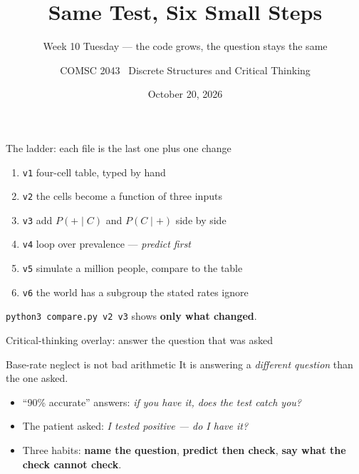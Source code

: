 \documentclass[aspectratio=169,10pt]{beamer}
\title{Same Test, Six Small Steps}
\subtitle{Week 10 Tuesday --- the code grows, the question stays the same}
\author{COMSC 2043 \textbullet\ Discrete Structures and Critical Thinking}
\date{October 20, 2026}
\begin{document}

\begin{frame}{The ladder: each file is the last one plus one change}
\begin{enumerate}
\item \texttt{v1} four-cell table, typed by hand
\item \texttt{v2} the cells become a function of three inputs
\item \texttt{v3} add $P(+\mid C)$ and $P(C\mid +)$ side by side
\item \texttt{v4} loop over prevalence --- \emph{predict first}
\item \texttt{v5} simulate a million people, compare to the table
\item \texttt{v6} the world has a subgroup the stated rates ignore
\end{enumerate}
\vspace{2mm}
\texttt{python3 compare.py v2 v3} shows \textbf{only what changed}.
\end{frame}

\begin{frame}{Critical-thinking overlay: answer the question that was asked}
\begin{block}{Base-rate neglect is not bad arithmetic}
It is answering a \emph{different question} than the one asked.
\end{block}
\begin{itemize}
\item ``90\% accurate'' answers: \emph{if you have it, does the test catch you?}
\item The patient asked: \emph{I tested positive --- do I have it?}
\item Three habits: \textbf{name the question}, \textbf{predict then check}, \textbf{say what the check cannot check}.
\end{itemize}
\end{frame}
\end{document}
